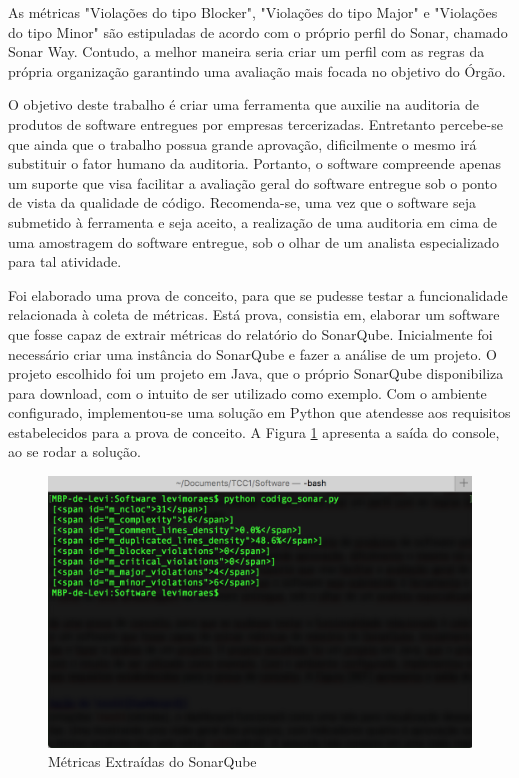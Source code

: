 As métricas "Violações do tipo Blocker", "Violações do tipo Major" e "Violações do tipo Minor" são estipuladas de acordo com o próprio perfil do Sonar, chamado Sonar Way. Contudo, a melhor maneira seria criar um perfil com as regras da própria organização garantindo uma avaliação mais focada no objetivo do Órgão.

O objetivo deste trabalho é criar uma ferramenta que auxilie na auditoria de produtos de software entregues por empresas tercerizadas. Entretanto percebe-se que ainda que o trabalho possua grande aprovação, dificilmente o mesmo irá substituir o fator humano da auditoria. Portanto, o software compreende apenas um suporte que visa facilitar a avaliação geral do software entregue sob o ponto de vista da qualidade de código. Recomenda-se, uma vez que o software seja submetido à ferramenta e seja aceito, a realização de uma auditoria em cima de uma amostragem do software entregue, sob o olhar de um analista especializado para tal atividade.

Foi elaborado uma prova de conceito, para que se pudesse testar a funcionalidade relacionada à coleta de métricas. Está prova, consistia em, elaborar um software que fosse capaz de extrair métricas do relatório do SonarQube. Inicialmente foi necessário criar uma instância do SonarQube e fazer a análise de um projeto. O projeto escolhido foi um projeto em Java, que o próprio SonarQube disponibiliza para download, com o intuito de ser utilizado como exemplo. Com o ambiente configurado, implementou-se uma solução em Python que atendesse aos requisitos estabelecidos para a prova de conceito. A Figura \ref{img:terminal} apresenta a saída do console, ao se rodar a solução.

\graphicspath{{figuras/}}
\begin{figure}[H]
\centering
\includegraphics[scale=0.60]{terminal.png}
\caption{Métricas Extraídas do SonarQube}
\label{img:terminal}
\end{figure}

